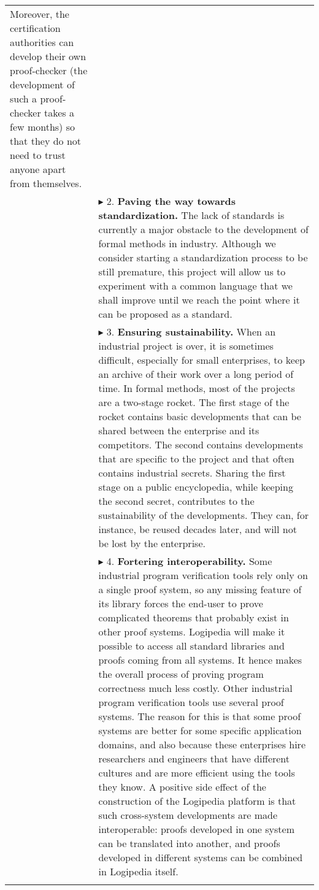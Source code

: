 \begin{longtable}{|p{}|p{}|}
Moreover, the certification authorities can develop their own
proof-checker (the development of such a proof-checker takes a few
months) so that they do not need to trust anyone apart from themselves.\\
&
$\blacktriangleright$
2.
{\bf Paving the way towards standardization.}
The lack of standards is currently a major obstacle to the development
of formal methods in industry. Although we consider starting a
standardization process to be still premature, this project will allow us
to experiment with a common language that we shall improve until we
reach the point where it can be proposed as a standard.\\
&
$\blacktriangleright$
3. 
{\bf Ensuring sustainability.}
When an industrial project is over, it is sometimes difficult,
especially for small enterprises, to keep an archive of their work over
a long period of time. In formal methods, most of the projects are a
two-stage rocket. The first stage of the rocket contains basic
developments that can be shared between the enterprise and its
competitors. The second contains developments that are specific to the
project and that often contains industrial secrets.
Sharing the first stage on a public encyclopedia, while keeping the
second secret, contributes to the sustainability of the
developments. They can, for instance, be reused decades later, and
will not be lost by the enterprise.\\
&
$\blacktriangleright$
4.
{\bf Fortering interoperability.}
  Some industrial program verification tools rely only on a single
  proof system, so any missing feature of its library forces the
  end-user to prove complicated theorems that probably exist in other
  proof systems. Logipedia will make it possible to access all
  standard libraries and proofs coming from all systems. It hence
  makes the overall process of proving program correctness much less costly.
  Other industrial program verification tools use several proof
  systems. The reason for this is that some proof systems are better for some
  specific application domains, and also
  because these enterprises hire researchers and engineers that have
  different cultures and are more efficient using the tools they know.
  A positive side effect of the construction of the Logipedia platform is that
  such cross-system developments are made interoperable: proofs
  developed in one system can be translated into another, and
  proofs developed in different systems can be combined in
  Logipedia itself.\\
&\\

\end{longtable}
